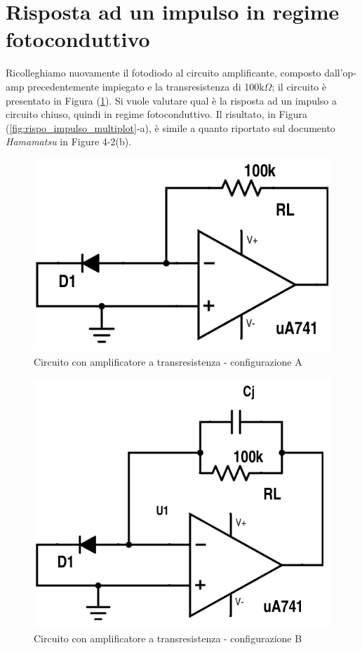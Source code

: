 \documentclass[journal, a4paper]{IEEEtran}
\begin{document}
\section{Risposta ad un impulso in regime fotoconduttivo}

Ricolleghiamo nuovamente il fotodiodo al circuito amplificante, composto dall'op-amp precedentemente impiegato e la transresistenza di 100k$\Omega$; il circuito è presentato in Figura (\ref{fig:es15-week06-a}). Si vuole valutare qual è la risposta ad un impulso a circuito chiuso, quindi in regime fotoconduttivo. Il risultato, in Figura (\ref{fig:rispo_impulso_multiplot}-a), è simile a quanto riportato sul documento \textit{Hamamatsu} in Figure 4-2(b).

\begin{figure}
\centering
\includegraphics[width=0.8\linewidth]{./es15-week06-a}
\caption{Circuito con amplificatore a transresistenza - configurazione A}
\label{fig:es15-week06-a}
\end{figure}

\begin{figure}
\centering
\includegraphics[width=0.8\linewidth]{./es15-week06-b}
\caption{Circuito con amplificatore a transresistenza - configurazione B}
\label{fig:es15-week06-b}
\end{figure}
\end{document}
